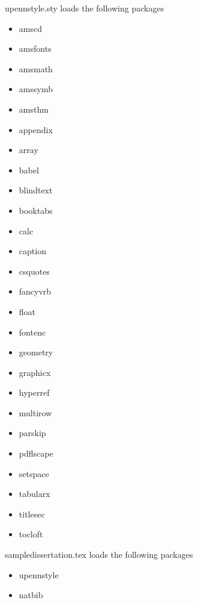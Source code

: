 
upennstyle.sty loads the following packages
\begin{itemize}
\item amscd
\item amsfonts
\item amsmath
\item amssymb
\item amsthm
\item appendix
\item array
\item babel
\item blindtext
\item booktabs
\item calc
\item caption
\item csquotes
\item fancyvrb
\item float
\item fontenc
\item geometry 
\item graphicx
\item hyperref
\item multirow
\item parskip
\item pdflscape
\item setspace
\item tabularx
\item titlesec
\item tocloft
\end{itemize}

sampledissertation.tex loads the following packages
\begin{itemize}
\item upennstyle
\item natbib
\end{itemize}